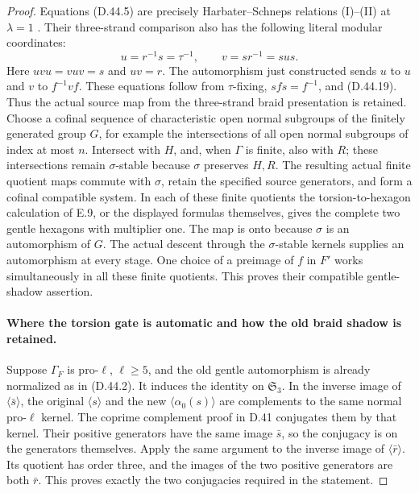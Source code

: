 \begin{proof}
Equations \textup{(D.44.5)}
are precisely Harbater--Schneps
relations (I)--(II) at
\(\lambda=1\)
\cite[\S0.1, (I)--(II);
Proposition~4]{DE_HarbaterSchneps2000}.
Their three-strand comparison
also has the following literal
modular coordinates:
\[
                    u=r^{-1}s=\tau^{-1},
           \qquad v=sr^{-1}=s u s .
 \tag{D.44.23}
\]
Here \(uvu=vuv=s\) and \(uv=r\).
The automorphism just constructed
sends \(u\) to \(u\) and
\(v\) to \(f^{-1}v f\).
These equations follow from
\(\tau\)-fixing, \(sfs=f^{-1}\),
and \textup{(D.44.19)}.
Thus the actual source map
from the three-strand braid
presentation is retained.
Choose a cofinal sequence of characteristic open normal
subgroups of the finitely generated group \(G\), for example
the intersections of all open normal subgroups of index
at most \(n\). Intersect with \(H\), and, when \(\Gamma\)
is finite, also with \(R\); these intersections remain
\(\sigma\)-stable because \(\sigma\) preserves \(H,R\).
The resulting actual finite quotient maps commute with
\(\sigma\), retain the specified source generators, and
form a cofinal compatible system. In each of these
finite quotients the
torsion-to-hexagon calculation
of E.9, or the displayed
formulas themselves, gives
the complete two gentle
hexagons with multiplier one.
The map is onto because
\(\sigma\) is an automorphism
of \(G\).
The actual descent through the \(\sigma\)-stable kernels
supplies an automorphism at every stage.
One choice of a preimage
of \(f\) in \(F'\) works
simultaneously in all these
finite quotients.
This proves their compatible
gentle-shadow assertion.

\paragraph{Where the torsion gate is automatic and how the old braid shadow is retained.}
Suppose \(\Gamma_F\) is
pro-\(\ell\), \(\ell\geq5\),
and the old gentle
automorphism is already
normalized as in
\textup{(D.44.2)}.
It induces the identity on
\(\mathfrak S_3\).
In the inverse image of
\(\langle\bar s\rangle\),
the original \(\langle s\rangle\)
and the new
\(\langle\alpha_0(s)\rangle\)
are complements to the same
normal pro-\(\ell\) kernel.
The coprime complement proof
in D.41 conjugates them
by that kernel.
Their positive generators
have the same image
\(\bar s\), so the conjugacy
is on the generators
themselves.
Apply the same argument
to the inverse image of
\(\langle\bar r\rangle\).
Its quotient has order three,
and the images of the two
positive generators are
both \(\bar r\).
This proves exactly the
two conjugacies required
in the statement.


\end{proof}
